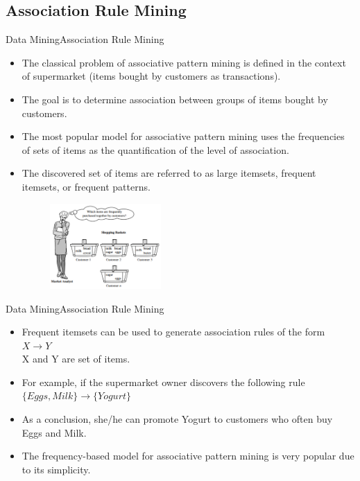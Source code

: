 \documentclass[10pt]{beamer}
\begin{document}
\subsection{Association Rule Mining}
\begin{frame}{Data Mining}{Association Rule Mining}
\begin{itemize}
\item The classical problem of associative pattern mining is defined in the context of
supermarket (items bought by customers as transactions).
\item The goal is to determine association between groups of items bought by customers.
\item The most popular model for associative pattern mining uses the frequencies of sets of
items as the quantification of the level of association.
\item The discovered set of items are referred to as large itemsets, frequent itemsets, or
frequent patterns.
\begin{figure}[H]
	\centering
	\includegraphics[width=0.4\textwidth]{images/Association.PNG}
	\label{fig:Classification}
\end{figure}
\end{itemize}
\end{frame}


\begin{frame}{Data Mining}{Association Rule Mining}
\begin{itemize}
\item Frequent itemsets can be used to generate association rules of the form
$X \rightarrow Y$\\
X and Y are set of items.
\item For example, if the supermarket owner discovers the following rule
$\{Eggs, Milk\} \rightarrow \{Yogurt\}$
\item As a conclusion, she/he can promote Yogurt to customers who often buy Eggs and Milk.
\item The frequency-based model for associative pattern mining is very popular due to its
simplicity.

\end{itemize}
\end{frame}
\end{document}
